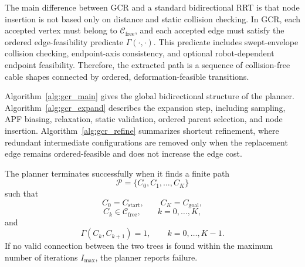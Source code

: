 \documentclass{pas}
\begin{document}
The main difference between GCR and a standard bidirectional RRT is that node insertion is not based only on distance and static collision checking. In GCR, each accepted vertex must belong to \(\mathcal{C}_{\mathrm{free}}\), and each accepted edge must satisfy the ordered edge-feasibility predicate \(\Gamma(\cdot,\cdot)\). This predicate includes swept-envelope collision checking, endpoint-axis consistency, and optional robot-dependent endpoint feasibility. Therefore, the extracted path is a sequence of collision-free cable shapes connected by ordered, deformation-feasible transitions.

Algorithm~\ref{alg:gcr_main} gives the global bidirectional structure of the planner. Algorithm~\ref{alg:gcr_expand} describes the expansion step, including sampling, APF biasing, relaxation, static validation, ordered parent selection, and node insertion. Algorithm~\ref{alg:gcr_refine} summarizes shortcut refinement, where redundant intermediate configurations are removed only when the replacement edge remains ordered-feasible and does not increase the edge cost.

The planner terminates successfully when it finds a finite path
\begin{equation}
\mathcal{P}=\{C_0,C_1,\ldots,C_K\}
\end{equation}
such that
\begin{equation}
C_0=C_{\mathrm{start}},
\qquad
C_K=C_{\mathrm{goal}},
\end{equation}
\begin{equation}
C_k\in \mathcal{C}_{\mathrm{free}},
\qquad
k=0,\ldots,K,
\end{equation}
and
\begin{equation}
\Gamma(C_k,C_{k+1})=1,
\qquad
k=0,\ldots,K-1.
\end{equation}
If no valid connection between the two trees is found within the maximum number of iterations \(I_{\max}\), the planner reports failure.
\end{document}
